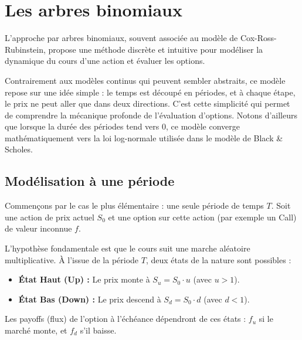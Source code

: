\newpage

\section{Les arbres binomiaux}

L'approche par arbres binomiaux, souvent associée au modèle de Cox-Ross-Rubinstein, propose une méthode discrète et intuitive pour modéliser la dynamique du cours d'une action et évaluer les options.

Contrairement aux modèles continus qui peuvent sembler abstraits, ce modèle repose sur une idée simple : le temps est découpé en périodes, et à chaque étape, le prix ne peut aller que dans deux directions. C'est cette simplicité qui permet de comprendre la mécanique profonde de l'évaluation d'options. Notons d'ailleurs que lorsque la durée des périodes tend vers 0, ce modèle converge mathématiquement vers la loi log-normale utilisée dans le modèle de Black \& Scholes.

\subsection{Modélisation à une période}

Commençons par le cas le plus élémentaire : une seule période de temps $T$.
Soit une action de prix actuel $S_0$ et une option sur cette action (par exemple un Call) de valeur inconnue $f$.

L'hypothèse fondamentale est que le cours suit une marche aléatoire multiplicative. À l'issue de la période $T$, deux états de la nature sont possibles :
\begin{itemize}
    \item \textbf{État Haut (Up) :} Le prix monte à $S_u = S_0 \cdot u$ (avec $u > 1$).
    \item \textbf{État Bas (Down) :} Le prix descend à $S_d = S_0 \cdot d$ (avec $d < 1$).
\end{itemize}

Les payoffs (flux) de l'option à l'échéance dépendront de ces états : $f_u$ si le marché monte, et $f_d$ s'il baisse.

\begin{center}
\end{center}

